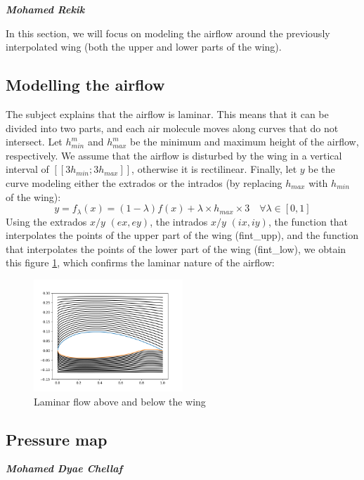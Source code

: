 \large \emph{\textbf{Mohamed Rekik}}

In this section, we will focus on modeling the airflow around the previously interpolated wing (both the upper and lower parts of the wing).
\subsection{Modelling the airflow}
The subject explains that the airflow is laminar. This means that it can be divided into two parts, and each air molecule moves along curves that do not intersect. Let $h_{min}^{m}$ and $h_{max}^{m}$ be the minimum and maximum height of the airflow, respectively. We assume that the airflow is disturbed by the wing in a vertical interval of $[[3h_{min}; 3h_{max}]]$, otherwise it is rectilinear. Finally, let $y$ be the curve modeling either the extrados or the intrados (by replacing $h_{max}$ with $h_{min}$ of the wing):
\begin{equation}
    \label{eq:equation_part3.1}
    y = f_{\lambda}(x) = (1 - \lambda)f(x) + \lambda \times h_{max} \times 3 \quad \forall \lambda \in [0,1] 
\end{equation}
Using the extrados $x/y$ $(ex, ey)$, the intrados $x/y$ $(ix, iy)$, the function that interpolates the points of the upper part of the wing (fint\_upp), and the function that interpolates the points of the lower part of the wing (fint\_low), we obtain this figure \ref{fig:laminar}, which confirms the laminar nature of the airflow:
\begin{figure}[H]
  \centering
  \includegraphics[width=0.5\textwidth]{img/laminar_flow.png}
  \caption{Laminar flow above and below the wing}
  \label{fig:laminar}
\end{figure}
\subsection{Pressure map}

\large \emph{\textbf{Mohamed Dyae Chellaf}}

